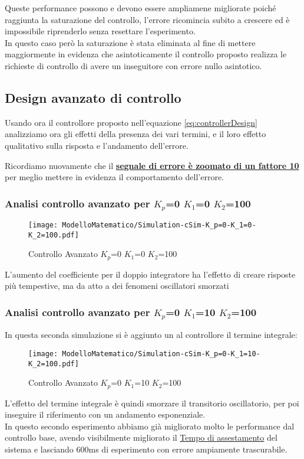 \noindent
Queste performance possono e devono essere ampliamene migliorate poiché raggiunta la saturazione del controllo, l'errore ricomincia subito a crescere ed è impossibile riprenderlo senza resettare l'esperimento.\\
In questo caso però la saturazione è stata eliminata al fine di mettere maggiormente in evidenza che asintoticamente il controllo proposto realizza le richieste di controllo di avere un inseguitore con errore nullo asintotico.

\newpage
\subsection{Design avanzato di controllo}
Usando ora il controllore proposto nell'equazione \ref{eq:controllerDesign} analizziamo ora gli effetti della presenza dei vari termini, e il loro effetto qualitativo sulla risposta e l'andamento dell'errore.
\begin{mdframed}[backgroundcolor=fawn]
Ricordiamo nuovamente che il {\color{cadmiumgreen}\textbf{\underline{segnale di errore è zoomato di un fattore 10}}} per meglio mettere in evidenza il comportamento dell'errore.
\end{mdframed}

\subsubsection{Analisi controllo avanzato per $ K_p $=0 $ K_1 $=0 $ K_2 $=100}
\begin{figure}[H]
	\centering
	\caption[Controllo Avanzato $ K_p $=0 $ K_1 $=0 $ K_2 $=100] {Controllo Avanzato $ K_p $=0 $ K_1 $=0 $ K_2 $=100}
	\texttt{[image: ModelloMatematico/Simulation-cSim-K\_p=0-K\_1=0-K\_2=100.pdf]}
\end{figure}
\noindent
L'aumento del coefficiente per il doppio integratore ha l'effetto di creare risposte più tempestive, ma da atto a dei fenomeni oscillatori smorzati

\subsubsection{Analisi controllo avanzato per $ K_p $=0 $ K_1 $=10 $ K_2 $=100}
In questa seconda simulazione si è aggiunto un al controllore il termine integrale:
\begin{figure}[H]
	\centering
	\caption[Controllo Avanzato $ K_p $=0 $ K_1 $=10 $ K_2 $=100]{Controllo Avanzato $ K_p $=0 $ K_1 $=10 $ K_2 $=100}
	\texttt{[image: ModelloMatematico/Simulation-cSim-K\_p=0-K\_1=10-K\_2=100.pdf]}
\end{figure}
\noindent
L'effetto del termine integrale è quindi smorzare il transitorio oscillatorio, per poi inseguire il riferimento con un andamento esponenziale.\\
In questo secondo esperimento abbiamo già migliorato molto le performance dal controllo base, avendo visibilmente migliorato il \underline{Tempo di assestamento} del sistema e lasciando 600ms di esperimento con errore ampiamente trascurabile.
\newpage
